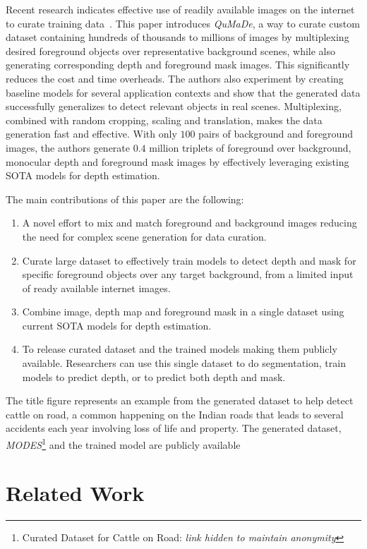 \documentclass[review]{cvpr}
\begin{document}
Recent research indicates effective use of readily available images on the internet to curate training data~\cite{li2018megadepth}. This paper introduces \textit{QuMaDe}, a way to curate custom dataset containing hundreds of thousands to millions of images by multiplexing desired foreground objects over representative background scenes, while also generating corresponding depth and foreground mask images. This significantly reduces the cost and time overheads. The authors also experiment by creating baseline models for several application contexts and show that the generated data successfully generalizes to detect relevant objects in real scenes. Multiplexing, combined with random cropping, scaling and translation, makes the data generation fast and effective. With only $100$ pairs of background and foreground images, the authors generate $0.4$ million triplets of foreground over background, monocular depth and foreground mask images by effectively leveraging existing SOTA models for depth estimation.

The main contributions of this paper are the following:
\begin{enumerate}
\item A novel effort to mix and match foreground and background images reducing the need for complex scene generation for data curation.
\item Curate large dataset to effectively train models to detect depth and mask for specific foreground objects over any target background, from a limited input of ready available internet images.
\item Combine image, depth map and foreground mask in a single dataset using current SOTA models for depth estimation.
\item To release curated dataset and the trained models making them publicly available. Researchers can use this single dataset to do segmentation, train models to predict depth, or to predict both depth and mask.
\end{enumerate}
  

The title figure represents an example from the generated dataset to help detect cattle on road,  a common happening on the Indian roads that leads to several accidents each year involving loss of life and property. The generated dataset, \textit{MODES}\footnote{Curated Dataset for Cattle on Road: \textit{link hidden to maintain anonymity}} and the trained model are publicly available


\section {Related Work}
\end{document}
